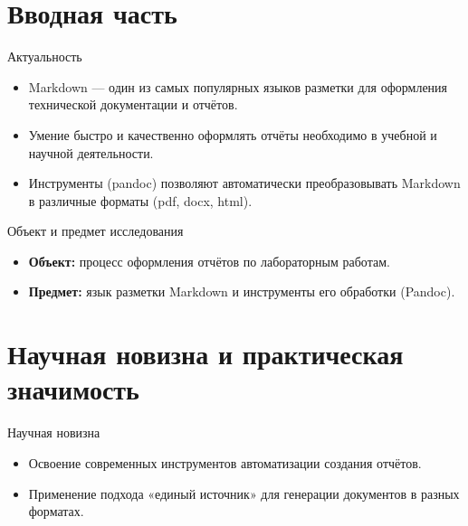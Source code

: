 \documentclass[
  ignorenonframetext,
  aspectratio=169,
  russian,
  aspectratio=169]{beamer}
\providecommand{\tightlist}{%
  \setlength{\itemsep}{0pt}\setlength{\parskip}{0pt}}
\begin{document}
\section{Вводная
часть}\label{ux432ux432ux43eux434ux43dux430ux44f-ux447ux430ux441ux442ux44c}

\begin{frame}{Актуальность}
\label{ux430ux43aux442ux443ux430ux43bux44cux43dux43eux441ux442ux44c}
\begin{itemize}[<+->]
\tightlist
\item
  Markdown --- один из самых популярных языков разметки для оформления
  технической документации и отчётов.
\item
  Умение быстро и качественно оформлять отчёты необходимо в учебной и
  научной деятельности.
\item
  Инструменты (pandoc) позволяют автоматически преобразовывать Markdown
  в различные форматы (pdf, docx, html).
\end{itemize}
\end{frame}

\begin{frame}{Объект и предмет исследования}
\label{ux43eux431ux44aux435ux43aux442-ux438-ux43fux440ux435ux434ux43cux435ux442-ux438ux441ux441ux43bux435ux434ux43eux432ux430ux43dux438ux44f}
\begin{itemize}[<+->]
\tightlist
\item
  \textbf{Объект:} процесс оформления отчётов по лабораторным работам.
\item
  \textbf{Предмет:} язык разметки Markdown и инструменты его обработки
  (Pandoc).
\end{itemize}
\end{frame}

\section{Научная новизна и практическая
значимость}\label{ux43dux430ux443ux447ux43dux430ux44f-ux43dux43eux432ux438ux437ux43dux430-ux438-ux43fux440ux430ux43aux442ux438ux447ux435ux441ux43aux430ux44f-ux437ux43dux430ux447ux438ux43cux43eux441ux442ux44c}

\begin{frame}{Научная новизна}
\label{ux43dux430ux443ux447ux43dux430ux44f-ux43dux43eux432ux438ux437ux43dux430}
\begin{itemize}[<+->]
\tightlist
\item
  Освоение современных инструментов автоматизации создания отчётов.
\item
  Применение подхода «единый источник» для генерации документов в разных
  форматах.
\end{itemize}
\end{frame}
\end{document}
